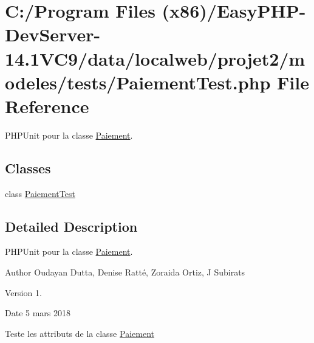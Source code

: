 \hypertarget{_paiement_test_8php}{}\section{C\+:/\+Program Files (x86)/\+Easy\+P\+H\+P-\/\+Dev\+Server-\/14.1\+V\+C9/data/localweb/projet2/modeles/tests/\+Paiement\+Test.php File Reference}
\label{_paiement_test_8php}


P\+H\+P\+Unit pour la classe \hyperlink{class_paiement}{Paiement}.  


\subsection*{Classes}
\begin{DoxyCompactItemize}
\item 
class \hyperlink{class_paiement_test}{Paiement\+Test}
\end{DoxyCompactItemize}


\subsection{Detailed Description}
P\+H\+P\+Unit pour la classe \hyperlink{class_paiement}{Paiement}. 

\begin{DoxyAuthor}{Author}
Oudayan Dutta, Denise Ratté, Zoraida Ortiz, J Subirats 
\end{DoxyAuthor}
\begin{DoxyVersion}{Version}
1. 
\end{DoxyVersion}
\begin{DoxyDate}{Date}
5 mars 2018
\end{DoxyDate}
Teste les attributs de la classe \hyperlink{class_paiement}{Paiement} 